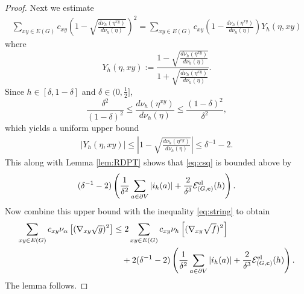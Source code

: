 \documentclass[11pt]{amsart}
\theoremstyle{plain}
\theoremstyle{definition}
\theoremstyle{remark}
\begin{document}
\begin{proof}
Next we estimate
\begin{align}
\label{eq:csq}
\sum_{xy \in E(G)} c_{xy} \left(1-\sqrt{\frac{d\nu_h(\eta^{xy})}{d\nu_h(\eta)}} \right)^2 = \sum_{xy\in E(G)} c_{xy} \left(1-\frac{d\nu_h(\eta^{xy})}{d\nu_h(\eta)}\right) Y_h(\eta, xy)
\end{align}
where
\[
Y_h(\eta,xy) := \frac{1-\sqrt{\frac{d\nu_h(\eta^{xy})}{d\nu_h(\eta)}}}{1+\sqrt{\frac{d\nu_h(\eta^{xy})}{d\nu_h(\eta)}}}.
\]
Since $h\in [\delta, 1-\delta]$ and $\delta\in (0,\frac{1}{2}]$,
\[
\frac{\delta^2}{(1-\delta)^2} \leq\frac{d\nu_h(\eta^{xy})}{d\nu_h(\eta)} \leq \frac{(1-\delta)^2}{\delta^2},
\]
which yields a uniform upper bound
\begin{align*}
 |Y_h(\eta,xy)| \leq \left|1-\sqrt{\frac{d\nu_h(\eta^{xy})}{d\nu_h(\eta)}}\right| \leq \delta^{-1}-2.
\end{align*}
This along with Lemma \ref{lem:RDPT} shows that \eqref{eq:csq} is bounded above by
\[
 (\delta^{-1}-2) \left( \frac{1}{\delta^2}\sum_{a\in \partial V} |i_h(a)| + \frac{2}{\delta^3} \mathcal{E}^{\rm el}_{(G,{\bf c})}(h)\right).
\]
Now combine this upper bound with the inequality \eqref{eq:string} to obtain
\begin{align*}
\sum_{xy\in E(G)} c_{xy} \nu_\alpha\left[(\nabla_{xy}\sqrt g)^2\right] &\leq 2 \sum_{xy\in E(G)} c_{xy} \nu_h\left[(\nabla_{xy}\sqrt f)^2\right] \\ & \quad +  2(\delta^{-1}-2) \left( \frac{1}{\delta^2}\sum_{a\in \partial V} |i_h(a)| + \frac{2}{\delta^3} \mathcal{E}^{\rm el}_{(G,{\bf c})}(h)\right).
\end{align*}
The lemma follows.
\end{proof}
\end{document}
